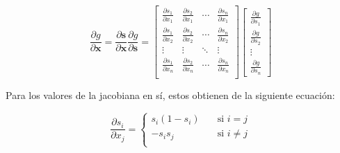 \documentclass{article}
\begin{document}
\renewcommand{\arraystretch}{1.8}

\def\one{1}

\begin{equation*}
	\frac{\partial g}{\partial \bm{x}} = 
	\frac{\partial \bm{s}}{\partial \bm{x}} \frac{\partial g}{\partial \bm{s}} =
	\begin{bmatrix}
		\frac{\partial s_1}{\partial x_1} & \frac{\partial s_2}{\partial x_1} & \cdots & \frac{\partial s_n}{\partial x_1} \\
		\frac{\partial s_1}{\partial x_2} & \frac{\partial s_2}{\partial x_2} & \cdots & \frac{\partial s_n}{\partial x_2} \\
		\vdots & \vdots & \ddots & \vdots \\
		\frac{\partial s_1}{\partial x_n} & \frac{\partial s_2}{\partial x_n} & \cdots & \frac{\partial s_n}{\partial x_n} \\
		
	\end{bmatrix}
	\begin{bmatrix}
		\frac{\partial g}{\partial s_1} \\
		\frac{\partial g}{\partial s_2} \\
		\vdots \\
		\frac{\partial g}{\partial s_n}
	\end{bmatrix}
\end{equation*}

Para los valores de la jacobiana en sí, estos obtienen de la siguiente ecuación:

\begin{equation*}
	\frac{\partial s_i}{\partial x_j} = \begin{cases}
		s_i (1 - s_i) \quad &\text{si } i = j \\
		- s_i s_j \quad &\text{si } i \neq j \\
	\end{cases}
\end{equation*}
\end{document}
